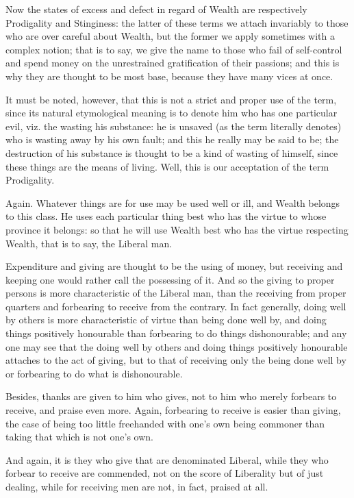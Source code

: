 Now the states of excess and defect in regard of Wealth are respectively
Prodigality and Stinginess: the latter of these terms we attach invariably to
those who are over careful about Wealth, but the former we apply sometimes with
a complex notion; that is to say, we give the name to those who fail of
self-control and spend money on the unrestrained gratification of their
passions; and this is why they are thought to be most base, because they have
many vices at once.

It must be noted, however, that this is not a strict and proper use of the
term, since its natural etymological meaning is to denote him who has one
particular evil, viz. the wasting his substance: he is unsaved (as the term
literally denotes) who is wasting away by his own fault; and this he really may
be said to be; the destruction of his substance is thought to be a kind of
wasting of himself, since these things are the means of living. Well, this is
our acceptation of the term Prodigality.

Again. Whatever things are for use may be used well or ill, and Wealth belongs
to this class. He uses each particular thing best who has the virtue to whose
province it belongs: so that he will use Wealth best who has the virtue
respecting Wealth, that is to say, the Liberal man.

Expenditure and giving are thought to be the using of money, but receiving and
keeping one would rather call the possessing of it. And so the giving to proper
persons is more characteristic of the Liberal man, than the receiving from
proper quarters and forbearing to receive from the contrary. In fact generally,
doing well by others is more characteristic of virtue than being done well by,
and doing things positively honourable than forbearing to do things
dishonourable; and any one may see that the doing well by others and doing
things positively honourable attaches to the act of giving, but to that of
receiving only the being done well by or forbearing to do what is
dishonourable.

Besides, thanks are given to him who gives, not to him who merely forbears to
receive, and praise even more. Again, forbearing to receive is easier than
giving, the case of being too little freehanded with one’s own being
commoner than taking that which is not one’s own.

And again, it is they who give that are denominated Liberal, while they who
forbear to receive are commended, not on the score of Liberality but of just
dealing, while for receiving men are not, in fact, praised at all.


